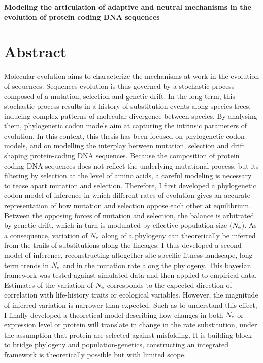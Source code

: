 \begin{center}
	\LARGE
	\textbf{Modeling the articulation of adaptive and neutral mechanisms in the evolution of protein coding DNA sequences}
\end{center}

\section*{Abstract}

Molecular evolution aims to characterize the mechanisms at work in the evolution of sequences.
Sequences evolution is thus governed by a stochastic process composed of a mutation, selection and genetic drift.
In the long term, this stochastic process results in a history of substitution events along species trees, inducing complex patterns of molecular divergence between species.
By analysing them, phylogenetic codon models aim at capturing the intrinsic parameters of evolution.
In this context, this thesis has been focused on phylogenetic codon models, and on modelling the interplay between mutation, selection and drift shaping protein-coding DNA sequences.
Because the composition of protein coding DNA sequences does not reflect the underlying mutational process, but its filtering by selection at the level of amino acids, a careful modeling is necessary to tease apart mutation and selection.
Therefore, I first developed a phylogenetic codon model of inference in which different rates of evolution gives an accurate representation of how mutation and selection oppose each other at equilibrium.
Between the opposing forces of mutation and selection, the balance is arbitrated by genetic drift, which in turn is modulated by effective population size ($N_{\textrm{e}}$).
As a consequence, variation of $N_{\textrm{e}}$ along of a phylogeny can theoretically be inferred from the trails of substitutions along the lineages.
I thus developed a second model of inference, reconstructing altogether site-specific fitness landscape, long-term trends in $N_{\textrm{e}}$ and in the mutation rate along the phylogeny.
This bayesian framework was tested against simulated data and then applied to empirical data.
Estimates of the variation of $N_{\textrm{e}}$ corresponds to the expected direction of correlation with life-history traits or ecological variables.
However, the magnitude of inferred variation is narrower than expected.
Such as to understand this effect, I finally developed a theoretical model describing how changes in both $N_{\textrm{e}}$ or expression level or protein will translate in change in the rate substitution, under the assumption that protein are selected against misfolding.
It is building block to bridge phylogeny and population-genetics, constructing an integrated framework is theoretically possible but with limited scope.
